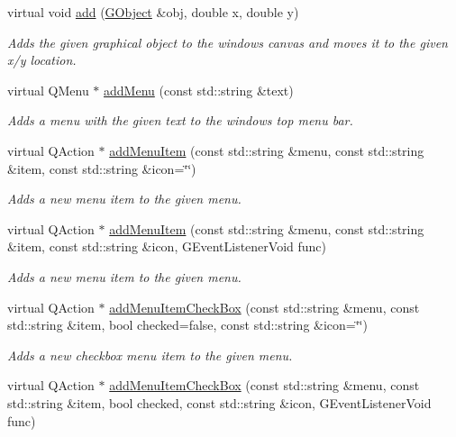 \begin{DoxyCompactItemize}
virtual void \mbox{\hyperlink{classGWindow_ac302bb932e3905e5d368ce735ad8444c}{add}} (\mbox{\hyperlink{classGObject}{G\+Object}} \&obj, double x, double y)
\begin{DoxyCompactList}\small\item\em Adds the given graphical object to the window\textquotesingle{}s canvas and moves it to the given x/y location. \end{DoxyCompactList}\item 
virtual Q\+Menu $\ast$ \mbox{\hyperlink{classGWindow_afffea482963d5566e97ccccb1f94a4e2}{add\+Menu}} (const std\+::string \&text)
\begin{DoxyCompactList}\small\item\em Adds a menu with the given text to the window\textquotesingle{}s top menu bar. \end{DoxyCompactList}\item 
virtual Q\+Action $\ast$ \mbox{\hyperlink{classGWindow_a43efd24277d68e749443cb7c36b65f4b}{add\+Menu\+Item}} (const std\+::string \&menu, const std\+::string \&item, const std\+::string \&icon=\char`\"{}\char`\"{})
\begin{DoxyCompactList}\small\item\em Adds a new menu item to the given menu. \end{DoxyCompactList}\item 
virtual Q\+Action $\ast$ \mbox{\hyperlink{classGWindow_ad57e2955efbfb5a0cccc981332945c8e}{add\+Menu\+Item}} (const std\+::string \&menu, const std\+::string \&item, const std\+::string \&icon, G\+Event\+Listener\+Void func)
\begin{DoxyCompactList}\small\item\em Adds a new menu item to the given menu. \end{DoxyCompactList}\item 
virtual Q\+Action $\ast$ \mbox{\hyperlink{classGWindow_ae363de5d4c0d5848a5936563b12c3288}{add\+Menu\+Item\+Check\+Box}} (const std\+::string \&menu, const std\+::string \&item, bool checked=false, const std\+::string \&icon=\char`\"{}\char`\"{})
\begin{DoxyCompactList}\small\item\em Adds a new checkbox menu item to the given menu. \end{DoxyCompactList}\item 
virtual Q\+Action $\ast$ \mbox{\hyperlink{classGWindow_aab18d66dc7ed71468da3611b28450995}{add\+Menu\+Item\+Check\+Box}} (const std\+::string \&menu, const std\+::string \&item, bool checked, const std\+::string \&icon, G\+Event\+Listener\+Void func)

\end{DoxyCompactItemize}
